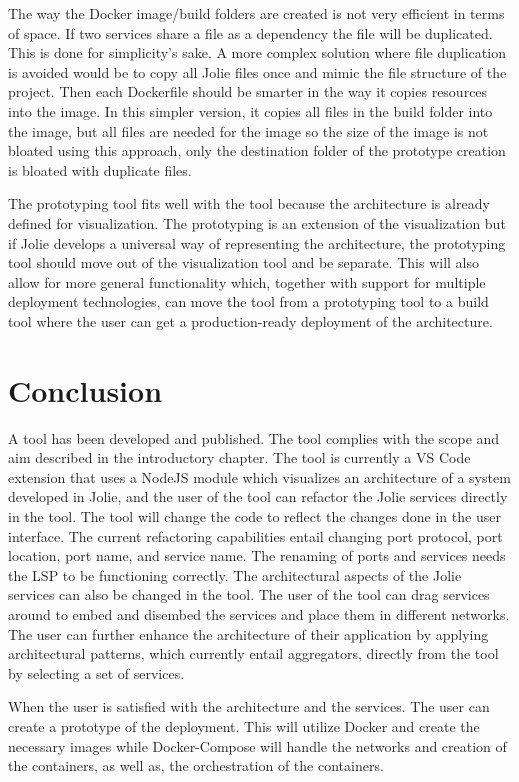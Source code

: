 The way the Docker image/build folders are created is not very efficient in terms of space. If two services share a file as a dependency the file will be duplicated.
This is done for simplicity's sake. A more complex solution where file duplication is avoided would be to copy all Jolie files once and mimic the file structure of the project.
Then each Dockerfile should be smarter in the way it copies resources into the image. In this simpler version, it copies all files in the build folder into the image, but all files are needed for the image so the size of the image is not bloated using this approach, only the destination folder of the prototype creation is bloated with duplicate files.

The prototyping tool fits well with the tool because the architecture is already defined for visualization.
The prototyping is an extension of the visualization but if Jolie develops a universal way of representing the architecture, the prototyping tool should move out of the visualization tool and be separate.
This will also allow for more general functionality which, together with support for multiple deployment technologies, can move the tool from a prototyping tool to a build tool where the user can get a production-ready deployment of the architecture.

\section{Conclusion}
A tool has been developed and published. The tool complies with the scope and aim described in the introductory chapter.
The tool is currently a VS Code extension that uses a NodeJS module which visualizes an architecture of a system developed in Jolie, and the user of the tool can refactor the Jolie services directly in the tool. The tool will change the code
to reflect the changes done in the user interface.
The current refactoring capabilities entail changing port protocol, port location, port name, and service name.
The renaming of ports and services needs the LSP to be functioning correctly.
The architectural aspects of the Jolie services can also be changed in the tool. The user of the tool can drag services around to embed and disembed the services and place them in different networks.
The user can further enhance the architecture of their application by applying architectural patterns, which currently entail aggregators, directly from the tool by selecting a set of services.

When the user is satisfied with the architecture and the services. The user can create a prototype of the deployment. This will utilize Docker and create the necessary images while Docker-Compose will handle the networks and creation of the containers, as well as, the orchestration of the containers.

